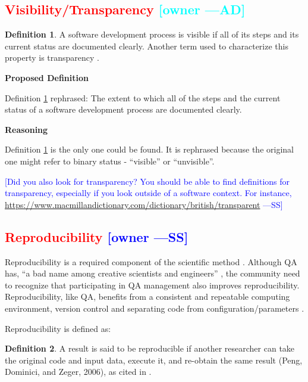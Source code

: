 \documentclass[letterpaper,cleveref]{lipics-v2019}
\newcommand{\authornote}[3]{\textcolor{#1}{[#3 ---#2]}}
\newcommand{\authornote}[3]{}
\newcommand{\wss}[1]{\authornote{blue}{SS}{#1}} %
\newcommand{\ad}[1]{\authornote{cyan}{AD}{#1}} %
\newcommand{\notdone}[1]{\textcolor{red}{#1}}
\theoremstyle{definition}
\newtheorem{defn}{Definition}
\begin{document}
\subsection{\notdone{Visibility/Transparency} \ad{owner}}

\begin{defn}
\label{VisibilitySelected}
A software development process is visible if all of its steps and its current
status are documented clearly. Another term used to characterize this property
is transparency \citep{ghezzi1991fundamentals}.
\end{defn}
      
\noindent \textbf{Proposed Definition} 

Definition \ref{VisibilitySelected} rephrased: The extent to which all of the
steps and the current status of a software development process are documented
clearly.

\noindent \textbf{Reasoning}

Definition \ref{VisibilitySelected} is the only one could be found. It is
rephrased because the original one might refer to binary status - ``visible'' or
``unvisible''.

\wss{Did you also look for transparency?  You should be able to find definitions
  for transparency, especially if you look outside of a software context.  For
  instance, \url{https://www.macmillandictionary.com/dictionary/british/transparent}}

\subsection{\notdone{Reproducibility} \wss{owner}}

Reproducibility is a required component of the scientific
method \citep{Davison2012}.  Although QA has, ``a bad name among creative
scientists and engineers'' \citep[p.~352]{Roache1998}, the community need to
recognize that participating in QA management also improves reproducibility.
Reproducibility, like QA, benefits from a consistent and repeatable computing
environment, version control and separating code from
configuration/parameters \citep{Davison2012}.

Reproducibility is defined as:

\begin{defn}
A result is said to be reproducible if another researcher can take the original
code and input data, execute it, and re-obtain the same result (Peng, Dominici,
and Zeger, 2006), as cited in \citet{BenureauAndRougier2017}.
\end{defn}
\end{document}

